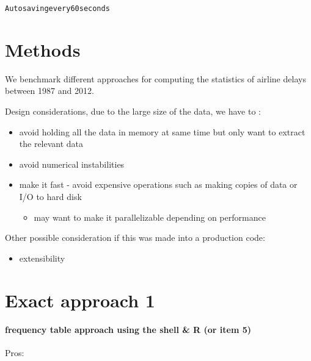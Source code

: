 \documentclass[letterpaper,10pt,english]{/usr/local/lib/python2.7/dist-packages/sphinx/texinputs/sphinxhowto}
\newenvironment{InvisibleVerbatim}
        {\begin{mdframed}[leftmargin=0.1\linewidth,innerleftmargin=3pt,innerrightmargin=3pt, userdefinedwidth=1\linewidth, linewidth=0pt, linecolor=white, usetwoside=false]}
        {\end{mdframed}}
\begin{document}
                \begin{InvisibleVerbatim}
                \vspace{-0.5\baselineskip}
\begin{alltt}Autosaving every 60 seconds
\end{alltt}

            \end{InvisibleVerbatim}
            
                \begin{InvisibleVerbatim}
                \vspace{-0.5\baselineskip}
            \end{InvisibleVerbatim}
            
                \begin{InvisibleVerbatim}
                \vspace{-0.5\baselineskip}
            \end{InvisibleVerbatim}
            
        
    
\part{Methods}We benchmark different approaches for computing the statistics of
airline delays between 1987 and 2012.

Design considerations, due to the large size of the data, we have to :

\begin{itemize}
\item
  avoid holding all the data in memory at same time but only want to
  extract the relevant data
\item
  avoid numerical instabilities
\item
  make it fast - avoid expensive operations such as making copies of
  data or I/O to hard disk

  \begin{itemize}
  \itemsep1pt\parskip0pt
  \item
    may want to make it parallelizable depending on performance
  \end{itemize}
\end{itemize}

Other possible consideration if this was made into a production code:

\begin{itemize}
\itemsep1pt\parskip0pt
\item
  extensibility
\end{itemize}\part{Exact approach 1}\subsection{frequency table approach using the shell \& R (or item 5)}Pros:
\end{document}
